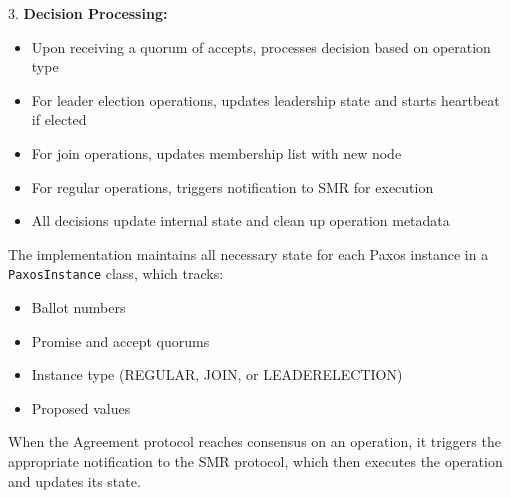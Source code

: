 \documentclass[10pt,a4paper,twocolumn]{article}
\begin{document}
3. \textbf{Decision Processing:}
   \begin{itemize}
    	\setlength\itemsep{0em}
   \item Upon receiving a quorum of accepts, processes decision based on operation type
   \item For leader election operations, updates leadership state and starts heartbeat if elected
   \item For join operations, updates membership list with new node
   \item For regular operations, triggers notification to SMR for execution 
   \item All decisions update internal state and clean up operation metadata
   \end{itemize}
The implementation maintains all necessary state for each Paxos instance in a \texttt{PaxosInstance} class, which tracks:
\begin{itemize}
  	\setlength\itemsep{0em}
	\item Ballot numbers
	\item Promise and accept quorums
	\item Instance type (REGULAR, JOIN, or LEADERELECTION)
	\item Proposed values
\end{itemize}
When the Agreement protocol reaches consensus on an operation, it triggers the appropriate notification to the SMR protocol, which then executes the operation and updates its state.
\end{document}
